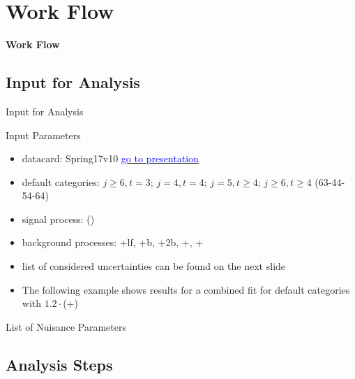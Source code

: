 \section{Work Flow}
\begin{frame}
\centering
\textbf{\huge{Work Flow}}
\end{frame}
\subsection{Input for Analysis}

\begin{frame}{Input for Analysis}

\begin{block}{Input Parameters}
\begin{itemize}
\item datacard: Spring17v10 \href{https://indico.cern.ch/event/628833/contributions/2624507/attachments/1474840/2283855/KITv10p2.pdf}{\textcolor{blue}{go to presentation}}
\item default categories: $j\geq 6, t=3$; $j=4, t=4$; $j=5, t\geq 4$; $j\geq 6, t\geq 4$ (63-44-54-64)
\item signal process: \ttbarH(\bbbar)
\item background processes: \ttbar+lf, \ttbar+b, \ttbar+2b, \ttbar+\bbbar, \ttbar + \ccbar
\item list of considered uncertainties can be found on the next slide
\end{itemize}
\end{block}
\begin{itemize}
\item The following example shows results for a combined fit for default categories with $\num[round-precision=1]{1.2}\cdot$(\ttbar+\bbbar)
\end{itemize}

\end{frame}

\begin{frame}{List of Nuisance Parameters}


\end{frame}


\subsection{Analysis Steps}

